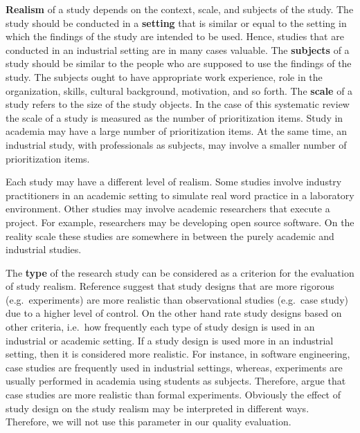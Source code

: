 \textbf{Realism} of a study depends on the context, scale, and subjects of the study.
The study should be conducted in a \textbf{setting} that is similar or equal to the setting in which the findings of the study are intended to be used. Hence, studies that are conducted in an industrial setting are in many cases valuable.
The \textbf{subjects} of a study should be similar to the people who are supposed to use the findings of the study. The subjects ought to have appropriate work experience, role in the organization, skills, cultural background, motivation, and so forth.
The \textbf{scale} of a study refers to the size of the study objects. 
In the case of this systematic review the scale of a study is measured as the number of prioritization items.
Study in academia may have a large number of prioritization items. At the same time, an industrial study, with professionals as subjects, may involve a smaller number of prioritization items.

Each study may have a different level of realism. Some studies involve industry practitioners in an academic setting to simulate real word practice in a laboratory environment.
Other studies may involve academic researchers that execute a project. For example, researchers may be developing open source software.
On the reality scale these studies are somewhere in between the purely academic and industrial studies.

The \textbf{type} of the research study can be considered as a criterion for the evaluation of study realism. Reference \citep{Kitchenham2004} suggest that study designs that are more rigorous (e.g.\ experiments) are more realistic than observational studies (e.g.\ case study) due to a higher level of control. On the other hand \citep{Ivarsson2010} rate study designs based on other criteria, i.e.\ how frequently each type of study design is used in an industrial or academic setting. If a study design is used more in an industrial setting, then it is considered more realistic. For instance, in software engineering, case studies are frequently used in industrial settings, whereas, experiments are usually performed in academia using students as subjects. Therefore, \citep{Ivarsson2010} argue that case studies are more realistic than  formal experiments. Obviously the effect of study design on the study realism may be interpreted in different ways. Therefore, we will not use this parameter in our quality evaluation.


